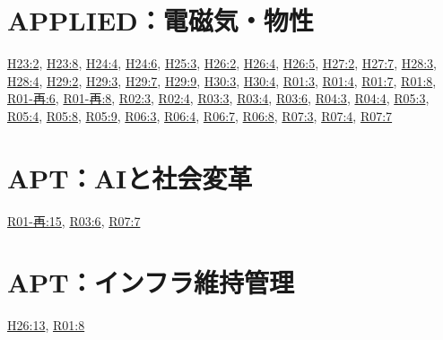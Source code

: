 \section{APPLIED：電磁気・物性}
\hyperref[q:h23-reg-applied-02]{H23:2}, \hyperref[q:h23-reg-applied-08]{H23:8}, \hyperref[q:h24-reg-applied-04]{H24:4}, \hyperref[q:h24-reg-applied-06]{H24:6}, \hyperref[q:h25-reg-applied-03]{H25:3}, \hyperref[q:h26-reg-applied-02]{H26:2}, \hyperref[q:h26-reg-applied-04]{H26:4}, \hyperref[q:h26-reg-applied-05]{H26:5}, \hyperref[q:h27-reg-applied-02]{H27:2}, \hyperref[q:h27-reg-applied-07]{H27:7}, \hyperref[q:h28-reg-applied-03]{H28:3}, \hyperref[q:h28-reg-applied-04]{H28:4}, \hyperref[q:h29-reg-applied-02]{H29:2}, \hyperref[q:h29-reg-applied-03]{H29:3}, \hyperref[q:h29-reg-applied-07]{H29:7}, \hyperref[q:h29-reg-applied-09]{H29:9}, \hyperref[q:h30-reg-applied-03]{H30:3}, \hyperref[q:h30-reg-applied-04]{H30:4}, \hyperref[q:r01-reg-applied-03]{R01:3}, \hyperref[q:r01-reg-applied-04]{R01:4}, \hyperref[q:r01-reg-applied-07]{R01:7}, \hyperref[q:r01-reg-applied-08]{R01:8}, \hyperref[q:r01-ret-applied-06]{R01-再:6}, \hyperref[q:r01-ret-applied-08]{R01-再:8}, \hyperref[q:r02-reg-applied-03]{R02:3}, \hyperref[q:r02-reg-applied-04]{R02:4}, \hyperref[q:r03-reg-applied-03]{R03:3}, \hyperref[q:r03-reg-applied-04]{R03:4}, \hyperref[q:r03-reg-applied-06]{R03:6}, \hyperref[q:r04-reg-applied-03]{R04:3}, \hyperref[q:r04-reg-applied-04]{R04:4}, \hyperref[q:r05-reg-applied-03]{R05:3}, \hyperref[q:r05-reg-applied-04]{R05:4}, \hyperref[q:r05-reg-applied-08]{R05:8}, \hyperref[q:r05-reg-applied-09]{R05:9}, \hyperref[q:r06-reg-applied-03]{R06:3}, \hyperref[q:r06-reg-applied-04]{R06:4}, \hyperref[q:r06-reg-applied-07]{R06:7}, \hyperref[q:r06-reg-applied-08]{R06:8}, \hyperref[q:r07-reg-applied-03]{R07:3}, \hyperref[q:r07-reg-applied-04]{R07:4}, \hyperref[q:r07-reg-applied-07]{R07:7}
\section{APT：AIと社会変革}
\hyperref[q:r01-ret-apt-15]{R01-再:15}, \hyperref[q:r03-reg-apt-06]{R03:6}, \hyperref[q:r07-reg-apt-07]{R07:7}
\section{APT：インフラ維持管理}
\hyperref[q:h26-reg-apt-13]{H26:13}, \hyperref[q:r01-reg-apt-08]{R01:8}
